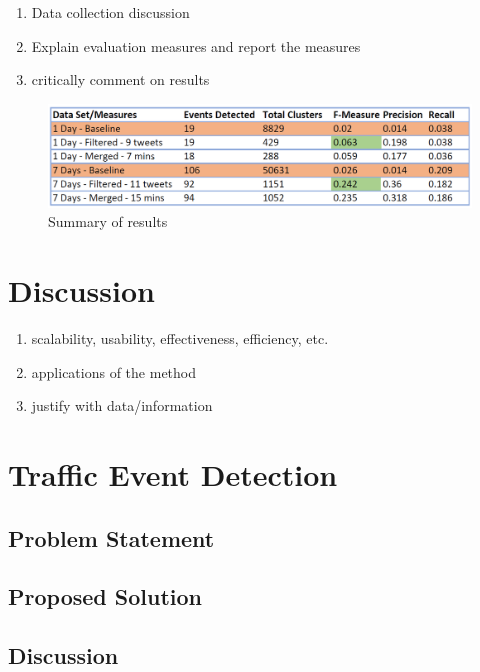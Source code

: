 \documentclass[a4paper,portrait,12pt]{article}
\begin{document}
\begin{enumerate}
	\item Data collection discussion
	\item Explain evaluation measures and report the measures
	\item critically comment on results
\end{enumerate}

\begin{figure}[h!]
	\centering
	\includegraphics[width=\linewidth]{images/summary.png}
	\caption{Summary of results}
	\label{fig:summary}
\end{figure}

\section{Discussion}
\label{section-discussion}
\begin{enumerate}
	\item scalability, usability, effectiveness, efficiency, etc.
	\item applications of the method
	\item justify with data/information
\end{enumerate}

\section{Traffic Event Detection}
\subsection{Problem Statement}
\subsection{Proposed Solution}
\subsection{Discussion}
\end{document}
